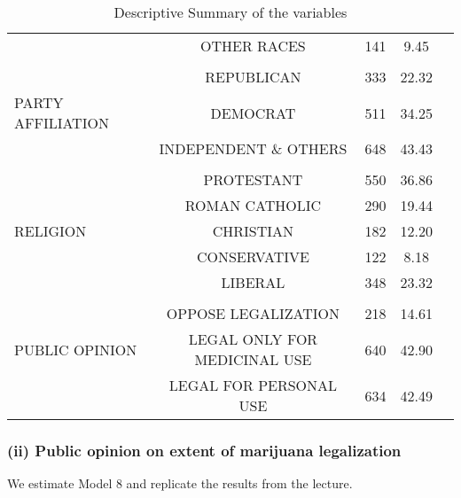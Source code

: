 \documentclass[a4paper]{article}
\begin{document}
\begin{tiny}
\begin{table}[ht]
\begin{tabular}{@{}lcccc@{}}
                &OTHER RACES           &     141         &      9.45          \\
                \cline{2-2}\\   
                &REPUBLICAN     &      333             &  22.32                  \\
    PARTY AFFILIATION   & DEMOCRAT           & 511           &34.25                    \\
                &INDEPENDENT \& OTHERS       &  648           &43.43                \\
                \cline{2-2}\\   
                &PROTESTANT       &     550              &36.86                    \\
                &ROMAN CATHOLIC        &290                   &19.44                    \\
    RELIGION    &CHRISTIAN           &182                   &12.20                    \\
                &CONSERVATIVE           &122                   &8.18                \\
                &LIBERAL        &  348                 &  23.32                  \\ 
                \cline{2-2}\\                     
                    &OPPOSE LEGALIZATION     &218        & 14.61                    \\
    PUBLIC OPINION  &LEGAL ONLY FOR MEDICINAL USE & 640      & 42.90                  \\
                    &LEGAL FOR PERSONAL USE      &634           &42.49              \\ \bottomrule
    \end{tabular}
    \caption{Descriptive Summary of the variables}
    \label{tab:Feb14Data}
    \end{table}

\end{tiny}

\pagebreak
\subsubsection*{(ii) Public opinion on extent of marijuana legalization}

We estimate Model 8 and replicate the results from the lecture.
\end{document}
